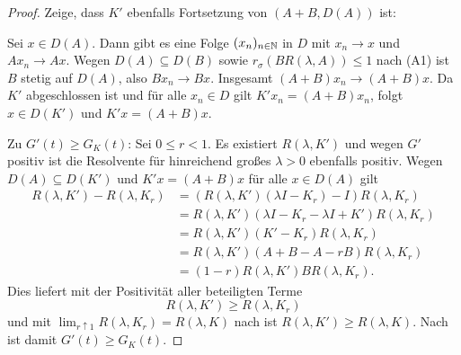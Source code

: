 \begin{proof}
\par 
Zeige, dass $K'$ ebenfalls Fortsetzung von $(A+B, D(A))$ ist: 
\par
Sei  $x\in D(A)$. Dann gibt es eine Folge $(x_n)_{n\in\mathbb{N}}$ in $D$ mit $x_n \to x$ und $Ax_n\to Ax$. Wegen $D(A)\subseteq D(B)$ sowie $r_\sigma(BR(\lambda, A))\leq 1$ nach (A1) ist $B$ stetig auf $D(A)$, also $Bx_n\to Bx$. Insgesamt $(A+B)x_n\to (A+B)x$. Da $K'$ abgeschlossen ist und für alle $x_n\in D$ gilt $K'x_n  = (A+B)x_n$, folgt $x\in D(K')$ und  $K'x=(A+B)x$.

\par
Zu $G'(t)\geq G_K(t)$: Sei $0\leq r <1$. Es existiert $R(\lambda, K')$ und wegen $G'$ positiv ist die Resolvente für hinreichend großes $\lambda>0$  ebenfalls positiv. Wegen $D(A)\subseteq D(K')$ und $K'x = (A+B)x$ für alle $x\in D(A)$ gilt
\begin{align*}
R(\lambda, K') - R(\lambda, K_r)
&= (R(\lambda, K')(\lambda I- K_r)-I)R(\lambda, K_r)\\
&= R(\lambda, K')(\lambda I- K_r - \lambda I+  K')R(\lambda, K_r)\\
&= R(\lambda, K')(K' - K_r)R(\lambda, K_r)\\
&= R(\lambda, K')(A+B - A - rB)R(\lambda, K_r)\\
&= (1-r)R(\lambda, K')BR(\lambda,  K_r).
\end{align*}
Dies liefert mit der Positivität aller beteiligten Terme
\begin{equation*}
R(\lambda, K')\geq R(\lambda, K_r)
\end{equation*}
und mit $\lim_{r\uparrow1}R(\lambda, K_r)=R(\lambda, K)$ nach  ist $R(\lambda, K')\geq R(\lambda, K)$. Nach  ist damit $G'(t)\geq G_K(t)$.
\end{proof}



